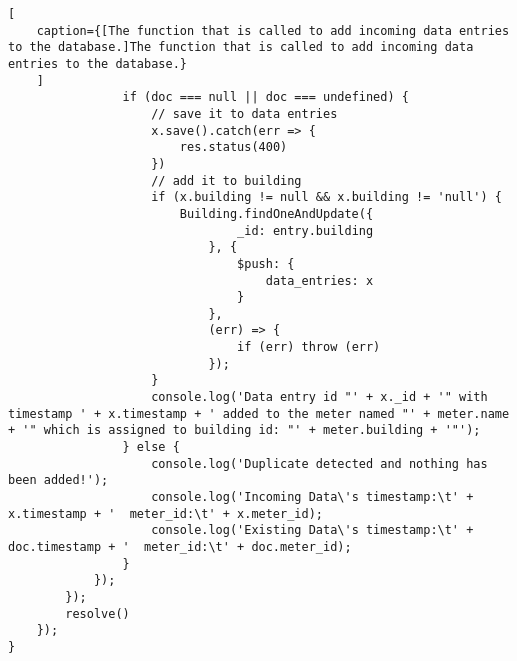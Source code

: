 \begin{lstlisting}[
    caption={[The function that is called to add incoming data entries to the database.]The function that is called to add incoming data entries to the database.}
    ]
                if (doc === null || doc === undefined) {
                    // save it to data entries
                    x.save().catch(err => {
                        res.status(400)
                    })
                    // add it to building
                    if (x.building != null && x.building != 'null') {
                        Building.findOneAndUpdate({
                                _id: entry.building
                            }, {
                                $push: {
                                    data_entries: x
                                }
                            },
                            (err) => {
                                if (err) throw (err)
                            });
                    }
                    console.log('Data entry id "' + x._id + '" with timestamp ' + x.timestamp + ' added to the meter named "' + meter.name + '" which is assigned to building id: "' + meter.building + '"');
                } else {
                    console.log('Duplicate detected and nothing has been added!');
                    console.log('Incoming Data\'s timestamp:\t' + x.timestamp + '  meter_id:\t' + x.meter_id);
                    console.log('Existing Data\'s timestamp:\t' + doc.timestamp + '  meter_id:\t' + doc.meter_id);
                }
            });
        });
        resolve()
    });
}
        
\end{lstlisting}